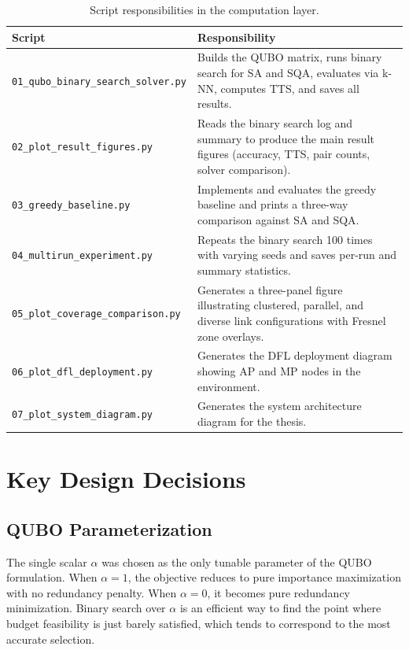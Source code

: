 \documentclass[12pt,a4paper]{article}
\begin{document}
\begin{table}[h!]
\centering
\renewcommand{\arraystretch}{1.3}
\begin{tabular}{@{}lp{9cm}@{}}
\toprule
\textbf{Script} & \textbf{Responsibility} \\
\midrule
\texttt{01\_qubo\_binary\_search\_solver.py}
    & Builds the QUBO matrix, runs binary search for SA and SQA,
      evaluates via k-NN, computes TTS, and saves all results. \\
\texttt{02\_plot\_result\_figures.py}
    & Reads the binary search log and summary to produce the main
      result figures (accuracy, TTS, pair counts, solver comparison). \\
\texttt{03\_greedy\_baseline.py}
    & Implements and evaluates the greedy baseline and prints a
      three-way comparison against SA and SQA. \\
\texttt{04\_multirun\_experiment.py}
    & Repeats the binary search 100 times with varying seeds and
      saves per-run and summary statistics. \\
\texttt{05\_plot\_coverage\_comparison.py}
    & Generates a three-panel figure illustrating clustered, parallel,
      and diverse link configurations with Fresnel zone overlays. \\
\texttt{06\_plot\_dfl\_deployment.py}
    & Generates the DFL deployment diagram showing AP and MP nodes
      in the environment. \\
\texttt{07\_plot\_system\_diagram.py}
    & Generates the system architecture diagram for the thesis. \\
\bottomrule
\end{tabular}
\caption{Script responsibilities in the computation layer.}
\end{table}

\section{Key Design Decisions}

\subsection{QUBO Parameterization}

The single scalar $\alpha$ was chosen as the only tunable parameter of the
QUBO formulation. When $\alpha = 1$, the objective reduces to pure importance
maximization with no redundancy penalty. When $\alpha = 0$, it becomes pure
redundancy minimization. Binary search over $\alpha$ is an efficient way to
find the point where budget feasibility is just barely satisfied, which tends
to correspond to the most accurate selection.
\end{document}
